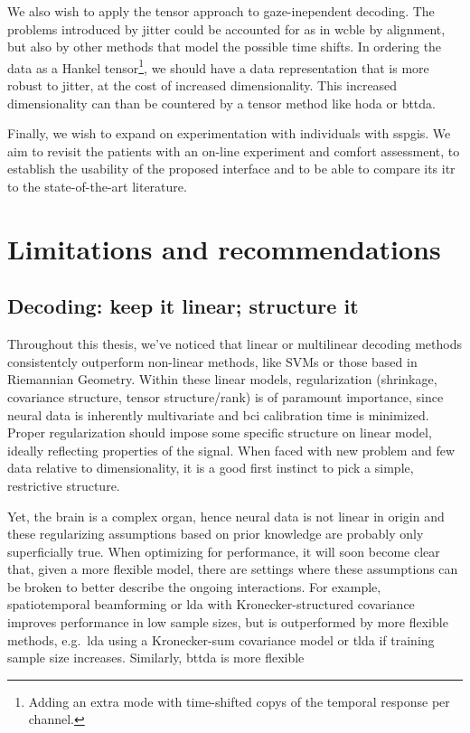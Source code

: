 We also wish to apply the tensor approach to gaze-inependent decoding.
The problems introduced by jitter could be accounted for as in \ac{wcble} by
alignment, but also by other methods that model the possible time shifts.
In ordering the data as a Hankel tensor\footnote{Adding an extra mode with
time-shifted copys of the temporal response per channel.}, we should have a
data representation that is more robust to jitter, at the cost of increased
dimensionality.
This increased dimensionality can than be countered by a tensor method like
\ac{hoda} or \ac{bttda}.

Finally, we wish to expand on experimentation with individuals with
\acp{sspgi}.
We aim to revisit the patients with an on-line experiment and comfort
assessment, to establish the usability of the proposed interface and to be able
to compare its \ac{itr}  to the state-of-the-art literature.

\section{Limitations and recommendations}

\subsection{Decoding: keep it linear; structure it}

Throughout this thesis, we've noticed that linear or multilinear decoding
methods consistentcly outperform non-linear methods, like SVMs or those based
in Riemannian Geometry.
Within these linear models, regularization (shrinkage, covariance structure,
tensor structure/rank) is of paramount importance, since neural data is
inherently multivariate and \ac{bci} calibration time is minimized.
Proper regularization should impose some specific structure on linear model,
ideally reflecting properties of the signal.
When faced with new problem and few data relative to dimensionality, it is a
good first instinct to pick a simple, restrictive structure.

Yet, the brain is a complex organ, hence neural data is not linear in origin and
these regularizing assumptions based on prior knowledge are probably only
superficially true.
When optimizing for performance, it will soon become clear that, given a more
flexible model, there are
settings where these assumptions can be broken to better describe the ongoing
interactions.
For example, spatiotemporal beamforming or \ac{lda} with Kronecker-structured covariance
improves performance in low sample sizes, but is outperformed by more flexible
methods, e.g.\ \ac{lda} using a Kronecker-sum covariance model or \ac{tlda}
if training sample size increases.
Similarly, \ac{bttda} is more flexible

